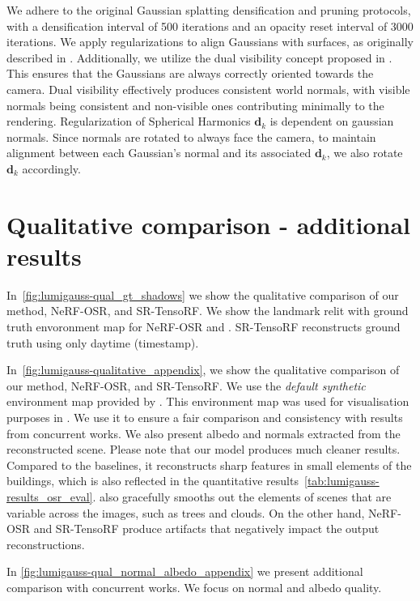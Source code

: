  We adhere to the original Gaussian splatting densification and pruning
  protocols, with a densification interval of 500 iterations and an opacity
  reset interval of 3000 iterations.
  We apply regularizations to align Gaussians with surfaces, as originally
  described in \cite{huang20242d}.
  Additionally, we utilize the dual visibility concept proposed in
  \cite{huang20242d}.
  This ensures that the Gaussians are always correctly oriented towards the
  camera.
  Dual visibility effectively produces consistent world normals, with visible
  normals being consistent and non-visible ones contributing minimally to the
  rendering.
  Regularization of Spherical Harmonics $\mathbf{d}_{k}$ is dependent on
  gaussian normals.
  Since normals are rotated to always face the camera, to maintain alignment
  between each Gaussian's normal and its associated \( \mathbf{d}_k \), we
  also rotate \( \mathbf{d}_k \) accordingly.

  
\section{Qualitative comparison - additional results}
  In~\cref{fig:lumigauss-qual_gt_shadows} we show the qualitative comparison
  of our method, NeRF-OSR, and SR-TensoRF.
  We show the landmark relit with ground truth envoronment map for NeRF-OSR
  and \lumigauss.
  SR-TensoRF reconstructs ground truth using only daytime (timestamp).

  In~\cref{fig:lumigauss-qualitative_appendix}, we show the qualitative
  comparison of our method, NeRF-OSR, and SR-TensoRF.
  We use the \textit{default synthetic} environment map provided by
  \cite{rudnev2022nerfosr}.
  This environment map was used for visualisation purposes in
  \cite{chang2024srtensorf}.
  We use it to ensure a fair comparison and consistency with results from
  concurrent works.
  We also present albedo and normals extracted from the reconstructed scene.
  Please note that our model produces much cleaner results.
  Compared to the baselines, it reconstructs sharp features in small elements
  of the buildings, which is also reflected in the quantitative
  results~\cref{tab:lumigauss-results_osr_eval}.
  \lumigauss also gracefully smooths out the elements of scenes that are variable across the images, such as trees and clouds.
  On the other hand, NeRF-OSR and SR-TensoRF produce artifacts that negatively
  impact the output reconstructions.

  In \cref{fig:lumigauss-qual_normal_albedo_appendix} we present additional
  comparison with concurrent works.
  We focus on normal and albedo quality.
  

